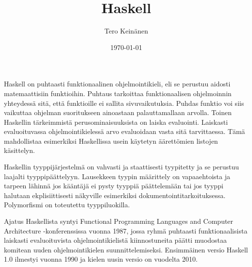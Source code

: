 \documentclass[finnish]{tktltiki2}
\title{Haskell}
\author{Tero Keinänen}
\date{\today}
\theoremstyle{definition}
\theoremstyle{remark}
\begin{document}

\frontmatter      %

\maketitle        %



\mainmatter       %



Haskell on puhtaasti funktionaalinen ohjelmointikieli, eli se perustuu aidosti matemaattisiin funktioihin. Puhtaus tarkoittaa funktionaalisen ohjelmoinnin yhteydessä sitä, että funktioille ei sallita sivuvaikutuksia. Puhdas funktio voi siis vaikuttaa ohjelman suoritukseen ainoastaan palauttamallaan arvolla.  Toinen Haskellin tärkeimmistä perusominaisuuksista on laiska evaluointi. Laiskasti evaluoituvassa ohjelmointikielessä arvo evaluoidaan vasta sitä tarvittaessa. Tämä mahdollistaa esimerkiksi Haskellissa usein käytetyn äärettömien listojen käsittelyn.

Haskellin tyyppijärjestelmä on vahvasti ja staattisesti tyypitetty ja se perustuu laajalti tyyppipäättelyyn. Lausekkeen tyypin määrittely on vapaaehtoista ja tarpeen lähinnä jos kääntäjä ei pysty tyyppiä päättelemään tai jos tyyppi halutaan ekplisiittisesti näkyville esimerkiksi dokumentointitarkoituksessa. Polymorfismi on toteutettu tyyppiluokilla.

Ajatus Haskellista syntyi Functional Programming Languages and Computer Architecture -konferenssissa vuonna 1987, jossa ryhmä puhtaasti funktionaalisista laiskasti evaluoituvista ohjelmointikielistä kiinnostuneita päätti muodostaa komitean uuden ohjelmointikielen suunnittelemiseksi. Ensimmäinen versio Haskell 1.0 ilmestyi vuonna 1990 ja kielen uusin versio on vuodelta 2010.



%
%
% 
%







% 
\end{document}
